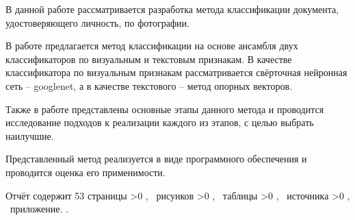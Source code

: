 \Referat

В данной работе рассматривается разработка метода классификации документа, удостоверяющего личность, по фотографии.

В работе предлагается метод классификации на основе ансамбля двух классификаторов по визуальным и текстовым признакам. В качестве классификатора по визуальным признакам рассматривается свёрточная нейронная сеть -- googlenet, а в качестве текстового -- метод опорных векторов. 

Также в работе представлены основные этапы данного метода и проводится исследование подходов к реализации каждого из этапов, с целью выбрать наилучшие.

Представленный метод реализуется в виде программного обеспечения и проводится оценка его применимости.

Отчёт содержит 53 страницы%
    \ifnum \totfig >0
    , \totfig~рисунков%
    \fi
    \ifnum \tottab >0
    , \tottab~таблицы%
    \fi
    \ifnum \totbib >0
    , \totbib~источника%
    \fi
    \ifnum \totapp >0
    , \totapp~приложение.%
    \else
    .%
    \fi

